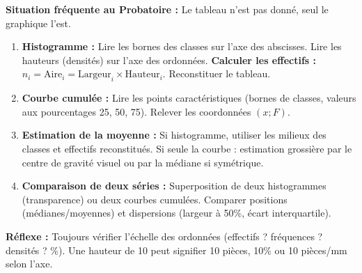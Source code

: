 \documentclass[11pt]{article}
\begin{document}
\begin{methode}
    \textbf{Situation fréquente au Probatoire :} Le tableau n'est pas donné, seul le graphique l'est.
    \begin{enumerate}
        \item \textbf{Histogramme :} Lire les bornes des classes sur l'axe des abscisses. Lire les hauteurs (densités) sur l'axe des ordonnées. \textbf{Calculer les effectifs :} $n_i = \text{Aire}_i = \text{Largeur}_i \times \text{Hauteur}_i$. Reconstituer le tableau.
        \item \textbf{Courbe cumulée :} Lire les points caractéristiques (bornes de classes, valeurs aux pourcentages 25, 50, 75). Relever les coordonnées $(x; F)$.
        \item \textbf{Estimation de la moyenne :} Si histogramme, utiliser les milieux des classes et effectifs reconstitués. Si seule la courbe : estimation grossière par le centre de gravité visuel ou par la médiane si symétrique.
        \item \textbf{Comparaison de deux séries :} Superposition de deux histogrammes (transparence) ou deux courbes cumulées. Comparer positions (médianes/moyennes) et dispersions (largeur à 50\%, écart interquartile).
    \end{enumerate}
    \textbf{Réflexe :} Toujours vérifier l'échelle des ordonnées (effectifs ? fréquences ? densités ? \%). Une hauteur de 10 peut signifier 10 pièces, 10\% ou 10 pièces/mm selon l'axe.
\end{methode}
\end{document}
